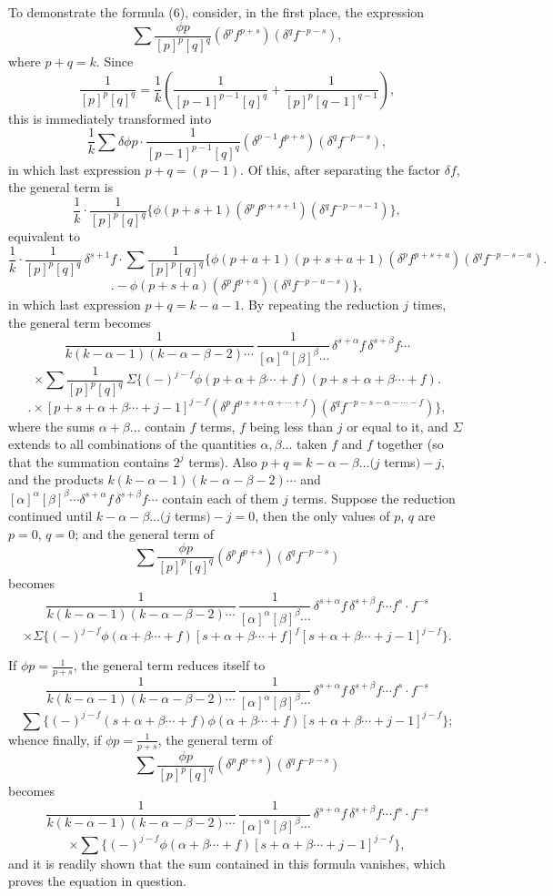 \documentclass[11pt]{article}
\begin{document}
To demonstrate the formula (6), consider, in the first place, the expression
\[ \sum \frac{\phi p}{[p]^p[q]^q}(\delta^p f^{p+s})(\delta^q f^{-p-s}), \]
where $p+q=k$. Since
\[ \frac{1}{[p]^p[q]^q} = \frac{1}{k}\!\left(\frac{1}{[p-1]^{p-1}[q]^q} + \frac{1}{[p]^p[q-1]^{q-1}}\right), \]
this is immediately transformed into
\[ \frac{1}{k}\sum\delta\phi p\cdot \frac{1}{[p-1]^{p-1}[q]^q}(\delta^{p-1}f^{p+s})(\delta^q f^{-p-s}), \]
in which last expression $p+q=(p-1)$. Of this, after separating the factor $\delta f$, the general term is
\[ \frac{1}{k}\!\cdot\!\frac{1}{[p]^p[q]^q}\bigl\{\phi(p+s+1)(\delta^p f^{p+s+1})(\delta^q f^{-p-s-1})\bigr\}, \]
equivalent to
\[ \frac{1}{k}\!\cdot\!\frac{1}{[p]^p[q]^q}\,\delta^{s+1}f\!\cdot\!\sum\!\frac{1}{[p]^p[q]^q}\bigl\{\phi(p+a+1)(p+s+a+1)(\delta^p f^{p+s+a})(\delta^q f^{-p-s-a})\bigr. \]
\[ \bigl. - \phi(p+s+a)(\delta^p f^{p+a})(\delta^q f^{-p-a-s})\bigr\}, \]
in which last expression $p+q = k - a - 1$. By repeating the reduction $j$ times, the general term becomes
\[ \frac{1}{k(k-\alpha-1)(k-\alpha-\beta-2)\cdots}\,\frac{1}{[\alpha]^\alpha[\beta]^\beta\cdots}\,\delta^{s+\alpha}f\,\delta^{s+\beta}f\cdots \]
\[ \times\sum\frac{1}{[p]^p[q]^q}\,\Sigma\!\bigl\{(-)^{j-f}\phi(p+\alpha+\beta\cdots+f)(p+s+\alpha+\beta\cdots+f)\bigr. \]
\[ \bigl. \times[p+s+\alpha+\beta\cdots+j-1]^{j-f}(\delta^p f^{p+s+\alpha+\cdots+f})(\delta^q f^{-p-s-\alpha-\cdots-f})\bigr\}, \]
where the sums $\alpha+\beta\ldots$ contain $f$ terms, $f$ being less than $j$ or equal to it, and $\Sigma$ extends to all combinations of the quantities $\alpha,\beta\ldots$ taken $f$ and $f$ together (so that the summation contains $2^j$ terms). Also $p+q = k-\alpha-\beta\ldots(j$ terms$)-j$, and the products $k(k-\alpha-1)(k-\alpha-\beta-2)\cdots$ and $[\alpha]^\alpha[\beta]^\beta\cdots\delta^{s+\alpha}f\,\delta^{s+\beta}f\cdots$ contain each of them $j$ terms. Suppose the reduction continued until $k-\alpha-\beta\ldots(j$ terms$)-j = 0$, then the only values of $p$, $q$ are $p=0$, $q=0$; and the general term of
\[ \sum\frac{\phi p}{[p]^p[q]^q}(\delta^p f^{p+s})(\delta^q f^{-p-s}) \]
becomes
\[ \frac{1}{k(k-\alpha-1)(k-\alpha-\beta-2)\cdots}\,\frac{1}{[\alpha]^\alpha[\beta]^\beta\cdots}\,\delta^{s+\alpha}f\,\delta^{s+\beta}f\cdots f^s\cdot f^{-s} \]
\[ \times \Sigma\bigl\{(-)^{j-f}\phi(\alpha+\beta\cdots+f)[s+\alpha+\beta\cdots+f]^f[s+\alpha+\beta\cdots+j-1]^{j-f}\bigr\}. \]

If $\phi p = \frac{1}{p+s}$, the general term reduces itself to
\[ \frac{1}{k(k-\alpha-1)(k-\alpha-\beta-2)\cdots}\,\frac{1}{[\alpha]^\alpha[\beta]^\beta\cdots}\,\delta^{s+\alpha}f\,\delta^{s+\beta}f\cdots f^s\cdot f^{-s} \]
\[ \sum\bigl\{(-)^{j-f}(s+\alpha+\beta\cdots+f)\phi(\alpha+\beta\cdots+f)[s+\alpha+\beta\cdots+j-1]^{j-f}\bigr\}; \]
whence finally, if $\phi p = \frac{1}{p+s}$, the general term of
\[ \sum\frac{\phi p}{[p]^p[q]^q}(\delta^p f^{p+s})(\delta^q f^{-p-s}) \]
becomes
\[ \frac{1}{k(k-\alpha-1)(k-\alpha-\beta-2)\cdots}\,\frac{1}{[\alpha]^\alpha[\beta]^\beta\cdots}\,\delta^{s+\alpha}f\,\delta^{s+\beta}f\cdots f^s\cdot f^{-s} \]
\[ \times\sum\bigl\{(-)^{j-f}\phi(\alpha+\beta\cdots+f)[s+\alpha+\beta\cdots+j-1]^{j-f}\bigr\}, \]
and it is readily shown that the sum contained in this formula vanishes, which proves the equation in question.
\end{document}

